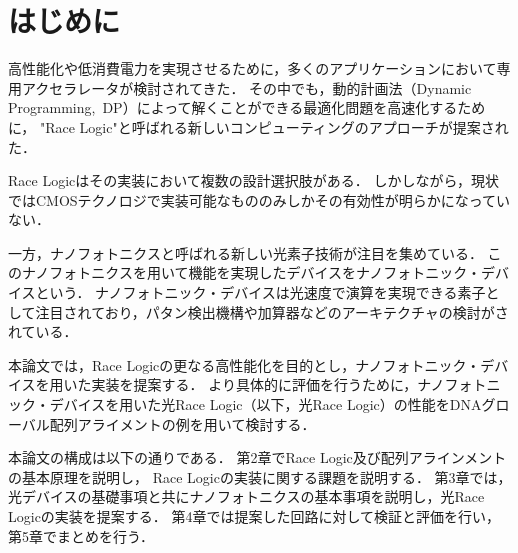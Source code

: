 \chapter{はじめに}
高性能化や低消費電力を実現させるために，多くのアプリケーションにおいて専用アクセラレータが検討されてきた．
その中でも，動的計画法（Dynamic Programming, DP）によって解くことができる最適化問題を高速化するために，
"Race Logic"と呼ばれる新しいコンピューティングのアプローチが提案された\cite{madhavan2014race}．

Race Logicはその実装において複数の設計選択肢がある．
しかしながら，現状ではCMOSテクノロジで実装可能なもののみしかその有効性が明らかになっていない．

一方，ナノフォトニクスと呼ばれる新しい光素子技術が注目を集めている．
このナノフォトニクスを用いて機能を実現したデバイスをナノフォトニック・デバイスという．
ナノフォトニック・デバイスは光速度で演算を実現できる素子として注目されており，パタン検出機構や加算器などのアーキテクチャの検討がされている．

本論文では，Race Logicの更なる高性能化を目的とし，ナノフォトニック・デバイスを用いた実装を提案する．
より具体的に評価を行うために，ナノフォトニック・デバイスを用いた光Race Logic（以下，光Race Logic）の性能をDNAグローバル配列アライメントの例を用いて検討する．

本論文の構成は以下の通りである．
第2章でRace Logic及び配列アラインメントの基本原理を説明し，
Race Logicの実装に関する課題を説明する．
第3章では，光デバイスの基礎事項と共にナノフォトニクスの基本事項を説明し，光Race Logicの実装を提案する．
第4章では提案した回路に対して検証と評価を行い，第5章でまとめを行う．

